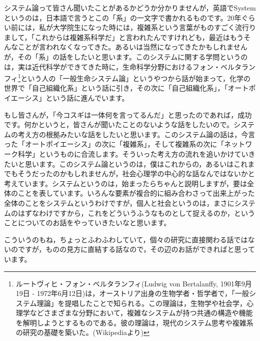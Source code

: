 \documentclass{ltjsbook}
\begin{document}
システム論って皆さん聞いたことがあるかどうか分かりませんが，英語でSystemというのは，日本語で言うとこの「系」の一文字で書かれるものです。20年ぐらい前には，私が大学院生になった時には，複雑系という言葉がものすごく流行りまして，「これからは複雑系科学だ」と言われたんですけれども，最近はもうそんなことが言われなくなってきた。あるいは当然になってきたかもしれませんが，その「系」の話をしたいと思います。このシステムに関する学問というのは，実は近代科学ができてきた時に，生命科学分野におけるフォン・ベルタランフィ\footnote{ルートヴィヒ・フォン・ベルタランフィ(Ludwig von Bertalanffy, 1901年9月19日 - 1972年6月12日)は，オーストリア出身の生物学者・哲学者で，「一般システム理論」を提唱したことで知られる。この理論は，生物学や社会学，心理学などさまざまな分野において，複雑なシステムが持つ共通の構造や機能を解明しようとするものである。彼の理論は，現代のシステム思考や複雑系の研究の基礎を築いた。(Wikipediaより)}という人の「一般生命システム論」というやつから話が始まって，化学の世界で「自己組織化系」という話に引き，その次に「自己組織化系」，「オートポイエーシス」という話に進んでいます。

もし皆さんが，「今コスギは一体何を言ってるんだ」と思ったのであれば，成功です。何かというと，皆さんが聞いたことのないような話をしたいので。システムの考え方の根拠みたいな話をしたいと思います。このシステム論の話は，今言った「オートポイエーシス」の次に「複雑系」，そして複雑系の次に「ネットワーク科学」というものに合流します。そういった考え方の流れを追いかけていきたいと思います。このシステム論というのは，僕はこれからの，あるいはこれまでもそうだったのかもしれませんが，社会心理学の中心的な話なんではないかと考えています。システムというのは，始まったらちゃんと説明しますが，要は全体のことを表しています。いろんな要素が複合的に組み合わさって出来上がった全体のことをシステムというわけですが，個人と社会というのは，まさにシステムのはずなわけですから，これをどういうふうなものとして捉えるのか，ということについてのお話をやっていきたいなと思います。

こういうのもね，ちょっとふわふわしていて，個々の研究に直接関わる話ではないのですが，ものの見方に直結する話なので，その辺のお話ができればと思っています。
\end{document}
